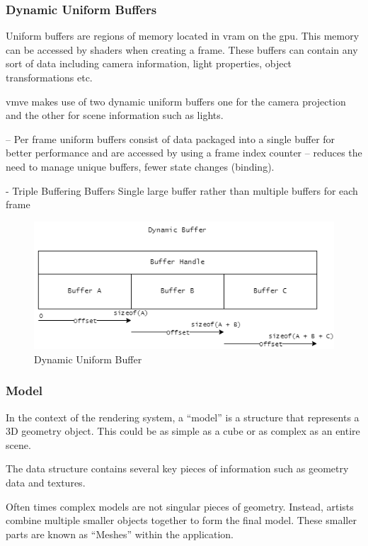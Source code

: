 \documentclass[11pt]{article}
\begin{document}
\subsubsection{Dynamic Uniform Buffers}
Uniform buffers are regions of memory located in \gls{vram} on the \gls{gpu}.
This memory can be accessed by shaders when creating a frame. These buffers can
contain any sort of data including camera information, light properties, object
transformations etc.

\gls{vmve} makes use of two dynamic uniform buffers one for the camera
projection and the other for scene information such as lights.


-- Per frame uniform buffers consist of data packaged into a single buffer for 
better performance and are accessed by using a frame index counter
-- reduces the need to manage unique buffers, fewer state changes (binding).

-   Triple Buffering Buffers Single large buffer rather than multiple buffers for each frame

\begin{figure}[h!]
  \centering
  \includegraphics[width=\textwidth]{images/dynamic_buffer.png}
  \caption{Dynamic Uniform Buffer}
  \label{fig:dynamic_uniform_buffer}
\end{figure}


\subsubsection{Model}
In the context of the rendering system, a ``model'' is a structure that represents
a 3D geometry object. This could be as simple as a cube or as complex as an
entire scene.

The data structure contains several key pieces of information such as geometry data
and textures. 

Often times complex models are not singular pieces of geometry. Instead, artists
combine multiple smaller objects together to form the final model. These smaller
parts are known as ``Meshes'' within the application.
\end{document}

